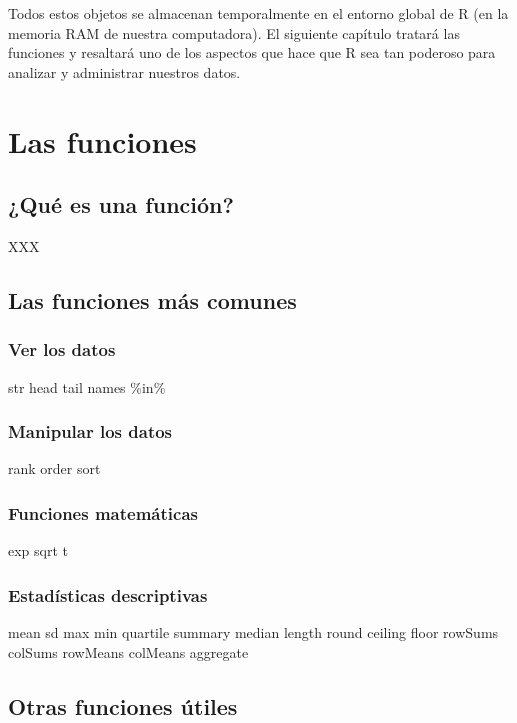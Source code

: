 \documentclass[]{book}
\begin{document}
Todos estos objetos se almacenan temporalmente en el entorno global de R
(en la memoria RAM de nuestra computadora). El siguiente capítulo
tratará las funciones y resaltará uno de los aspectos que hace que R sea
tan poderoso para analizar y administrar nuestros datos.

\chapter{Las funciones}\label{fonctions}

\section{¿Qué es una función?}\label{que-es-una-funcion}

XXX

\section{Las funciones más comunes}\label{las-funciones-mas-comunes}

\subsection{Ver los datos}\label{ver-los-datos}

str head tail names \%in\%

\subsection{Manipular los datos}\label{manipular-los-datos}

rank order sort

\subsection{Funciones matemáticas}\label{funciones-matematicas}

exp sqrt t

\subsection{Estadísticas descriptivas}\label{estadisticas-descriptivas}

mean sd max min quartile summary median length round ceiling floor
rowSums colSums rowMeans colMeans aggregate

\section{Otras funciones útiles}\label{otras-funciones-utiles}
\end{document}
